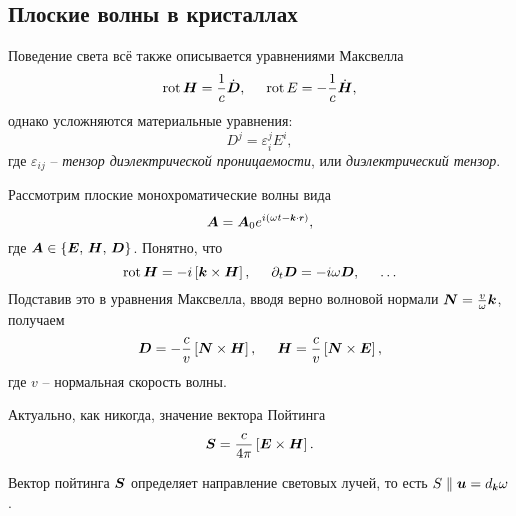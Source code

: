 \subsection{Плоские волны в кристаллах}

Поведение света всё также описывается уравнениями Максвелла
\begin{equation*}
    \mathop{\mathrm{rot}}\nolimits \mbox{\boldmath $H$} = \frac{1}{c} \dot{\mbox{\boldmath $D$}},
    \hspace{5 mm} 
    \mathop{\mathrm{rot}}\nolimits E = - \frac{1}{c} \dot{\mbox{\boldmath $H$}},
\end{equation*}
однако усложняются материальные уравнения:
\begin{equation*}
    D^j = \varepsilon_i^j E^i,
\end{equation*}
где $\varepsilon_{ij}$ -- \textit{тензор диэлектрической проницаемости}, или \textit{диэлектрический тензор}.

Рассмотрим плоские монохроматические волны вида
\begin{equation*}
    \vc{A} = \vc{A}_0 e^{i(\omega t - \smallvc{k} \cdot \smallvc{r})}, 
\end{equation*}
где $\mbox{\boldmath $A$} \in \{\mbox{\boldmath $E$},\, \mbox{\boldmath $H$},\, \mbox{\boldmath $D$}\}$. Понятно, что
\begin{equation*}
    \mathop{\mathrm{rot}}\nolimits \mbox{\boldmath $H$} = -i \left[\mbox{\boldmath $k$} \times  \mbox{\boldmath $H$}\right],
    \hspace{5 mm} 
    \partial_t \mbox{\boldmath $D$} = - i \omega \mbox{\boldmath $D$}, \hspace{5 mm} \ldots
\end{equation*}
Подставив это в уравнения Максвелла, вводя верно волновой нормали $\mbox{\boldmath $N$} = \frac{v}{\omega} \mbox{\boldmath $k$}$, получаем
\begin{equation*}
    \mbox{\boldmath $D$} = - \frac{c}{v} \left[\mbox{\boldmath $N$} \times \mbox{\boldmath $H$}\right],
    \hspace{5 mm} 
    \mbox{\boldmath $H$} = \frac{c}{v} \left[\mbox{\boldmath $N$} \times \mbox{\boldmath $E$}\right],
\end{equation*}
где $v$ -- нормальная скорость волны. 

Актуально, как никогда, значение вектора Пойтинга
\begin{equation*}
    \mbox{\boldmath $S$} = \frac{c}{4\pi}\left[\mbox{\boldmath $E$} \times \mbox{\boldmath $H$}\right].
\end{equation*}

\begin{to_lem}
    Вектор пойтинга $\mbox{\boldmath $S$}$ определяет направление световых лучей, то есть $S \parallel \vc{u} = d_{\smallvc{k}} \omega$.
\end{to_lem}

